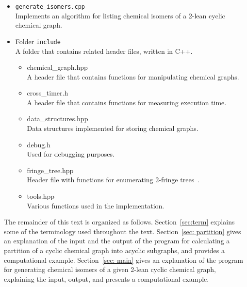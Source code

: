 \documentclass[11pt,titlepage,dvipdfmx,twoside]{article}
\begin{document}
\begin{itemize}
\begin{itemize}
\begin{itemize}
		    \item{ \tt generate\_isomers.cpp}\\
			    Implements an algorithm for listing chemical isomers of
			    a 2-lean cyclic chemical graph.

	\item Folder {\tt include}\\
		A folder that contains related header files, written in C++.
		\begin{itemize}
			\item{chemical\_graph.hpp}\\
			  A header file that contains functions for manipulating 
			  chemical graphs.
			\item{cross\_timer.h}\\
				A header file that contains functions for measuring execution time.
				
			\item{data\_structures.hpp}\\
				Data structures implemented for storing chemical graphs.
				
			\item{debug.h}\\
				Used for debugging purposes.
				
			\item{fringe\_tree.hpp}\\
				Header file with functions for enumerating 2-fringe trees~\cite{branch}.
				
			\item{tools.hpp}\\
				Various functions used in the implementation.
		\end{itemize}
		\end{itemize}
	  \end{itemize}
      \end{itemize}

The remainder of this text is organized as follows.
Section~\ref{sec:term} explains some of the terminology used throughout the text.
Section~\ref{sec: partition} gives an explanation of the input and the output of
the program for calculating a partition of a cyclic chemical graph into
acyclic subgraphs, and provides a computational example.
Section~\ref{sec: main}
gives an explanation of the program for generating chemical isomers of
a given 2-lean cyclic chemical graph, explaining the input, output, and
presents a computational example.


\end{document}
